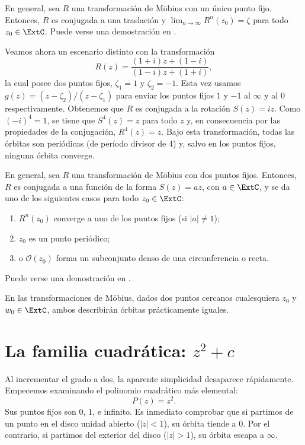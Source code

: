 \begin{observacion}
    En general, sea $R$ una transformación de Möbius con un único punto fijo.
    Entonces, $R$ es conjugada a una traslación y $\lim_{n \to \infty} R^n(z_0)
    = \zeta$ para todo $z_0 \in \ExtC$. Puede verse una demostración en
    \cite[4-5]{Beardon1991}.
\end{observacion}

Veamos ahora un escenario distinto con la transformación
\[
    R(z) = \frac{(1+i)z + (1-i)}{(1-i)z + (1+i)},
\]
la cual posee dos puntos fijos, $\zeta_1 = 1$ y $\zeta_2 = -1$. Esta vez usamos
$g(z) = (z-\zeta_2)/(z-\zeta_1)$ para enviar los puntos fijos $1$ y $-1$ al
$\infty$ y al $0$ respectivamente. Obtenemos que $R$ es conjugada a la rotación
$S(z) = iz$. Como $(-i)^4=1$, se tiene que $S^4(z)=z$ para todo $z$ y, en
consecuencia por las propiedades de la conjugación, $R^4(z)= z$. Bajo esta
transformación, todas las órbitas son periódicas (de período divisor de 4) y,
salvo en los puntos fijos, ninguna órbita converge.

\begin{observacion}
    En general, sea $R$ una transformación de Möbius con dos puntos fijos.
    Entonces, $R$ es conjugada a una función de la forma $S(z) = az$, con $a \in
    \ExtC$, y se da uno de los siguientes casos para todo $z_0 \in \ExtC$:
    \begin{enumerate}
        \item $R^n(z_0)$ converge a uno de los puntos fijos (si $|a| \neq 1$);
        \item $z_0$ es un punto periódico;
        \item o $\mathcal{O}(z_0)$ forma un subconjunto denso de una
        circunferencia o recta.
    \end{enumerate}
    Puede verse una demostración en \cite[5]{Beardon1991}.
\end{observacion}

En las transformaciones de Möbius, dados dos puntos cercanos cualesquiera $z_0$
y $w_0 \in \ExtC$, ambos describirán órbitas prácticamente iguales.


\section{La familia cuadrática: $z^2 + c$}
Al incrementar el grado a dos, la aparente simplicidad desaparece rápidamente.
Empecemos examinando el polinomio cuadrático más elemental:
\[
    P(z) = z^2.
\]
Sus puntos fijos son $0$, $1$, e infinito. Es inmediato comprobar que si
partimos de un punto en el disco unidad abierto ($|z| < 1$), su órbita tiende a
$0$. Por el contrario, si partimos del exterior del disco ($|z| > 1$), su órbita
escapa a $\infty$.%

